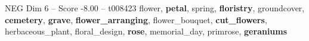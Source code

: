 \begin{textsample}{NEG Dim 6 – Score -8.00 – t008423}  \label{ex:f6_neg_038}
flower, \textbf{petal}, spring, \textbf{floristry}, groundcover, \textbf{cemetery}, \textbf{grave}, \textbf{flower\_arranging}, flower\_bouquet, \textbf{cut\_flowers}, herbaceous\_plant, floral\_design, \textbf{rose}, memorial\_day, primrose, \textbf{geraniums}

\end{textsample}

